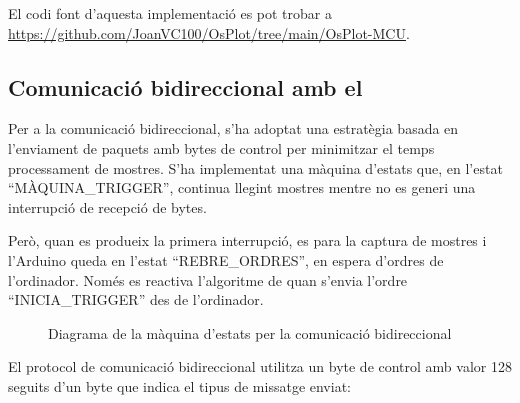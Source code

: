 \documentclass{tfgitic}[2023/06/30]
\begin{document}
El codi font d'aquesta implementació es pot trobar a
\url{https://github.com/JoanVC100/OsPlot/tree/main/OsPlot-MCU}.

\subsection{Comunicació bidireccional amb el }

Per a la comunicació bidireccional, s'ha adoptat una estratègia basada
en l'enviament de paquets amb bytes de control per minimitzar el temps
processament de mostres. S'ha implementat una màquina d'estats que, en
l'estat ``MÀQUINA\_TRIGGER'', continua llegint mostres mentre no es
generi una interrupció de recepció de bytes.

Però, quan es produeix la primera interrupció, es para la captura de
mostres i l'Arduino queda en l'estat ``REBRE\_ORDRES'', en espera
d'ordres de l'ordinador. Només es reactiva l'algoritme de
 quan s'envia l'ordre ``INICIA\_TRIGGER'' des de
l'ordinador.

\begin{figure}[!hb]
      \centering
      \caption{Diagrama de la màquina d'estats per la comunicació bidireccional}
\end{figure}

\clearpage

El protocol de comunicació bidireccional utilitza un byte de control
amb valor \num{128} seguits d'un byte que indica el tipus de missatge
enviat:
\end{document}
